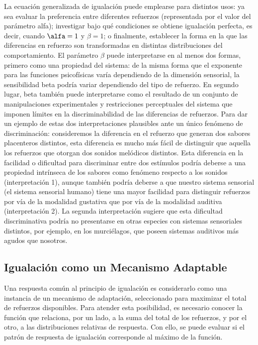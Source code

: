 \documentclass[
  a4paper,
  DIV=11,
  numbers=noendperiod]{scrreprt}
\begin{document}
La ecuación generalizada de igualación puede emplearse para distintos
usos: ya sea evaluar la preferencia entre diferentes refuerzos
(representada por el valor del parámetro alfa); investigar bajo qué
condiciones se obtiene igualación perfecta, es decir, cuando
\(\alfa = 1\) y \(\beta = 1\); o finalmente, establecer la forma en la
que las diferencias en refuerzo son transformadas en distintas
distribuciones del comportamiento. El parámetro \(\beta\) puede
interpretarse en al menos dos formas, primero como una propiedad del
sistema: de la misma forma que el exponente para las funciones
psicofísicas varía dependiendo de la dimensión sensorial, la
sensibilidad beta podría variar dependiendo del tipo de refuerzo. En
segundo lugar, beta también puede interpretarse como el resultado de un
conjunto de manipulaciones experimentales y restricciones perceptuales
del sistema que imponen límites en la discriminabilidad de las
diferencias de refuerzos. Para dar un ejemplo de estas dos
interpretaciones plausibles ante un único fenómeno de discriminación:
consideremos la diferencia en el refuerzo que generan dos sabores
placenteros distintos, esta diferencia es mucho más fácil de distinguir
que aquella los refuerzos que otorgan dos sonidos melódicos distintos.
Esta diferencia en la facilidad o dificultad para discriminar entre dos
estímulos podría deberse a una propiedad intrínseca de los sabores como
fenómeno respecto a los sonidos (interpretación 1), aunque también
podría deberse a que nuestro sistema sensorial (el sistema sensorial
humano) tiene una mayor facilidad para distinguir refuerzos por vía de
la modalidad gustativa que por vía de la modalidad auditiva
(interpretación 2). La segunda interpretación sugiere que esta
dificultad discriminativa podría no presentarse en otras especies con
sistemas sensoriales distintos, por ejemplo, en los murciélagos, que
poseen sistemas auditivos más agudos que nosotros.

\subsection{Igualación como un Mecanismo
Adaptable}\label{igualaciuxf3n-como-un-mecanismo-adaptable}

Una respuesta común al principio de igualación es considerarlo como una
instancia de un mecanismo de adaptación, seleccionado para maximizar el
total de refuerzos disponibles. Para atender esta posibilidad, es
necesario conocer la función que relaciona, por un lado, a la suma del
total de los refuerzos, y por el otro, a las distribuciones relativas de
respuesta. Con ello, se puede evaluar si el patrón de respuesta de
igualación corresponde al máximo de la función.
\end{document}
